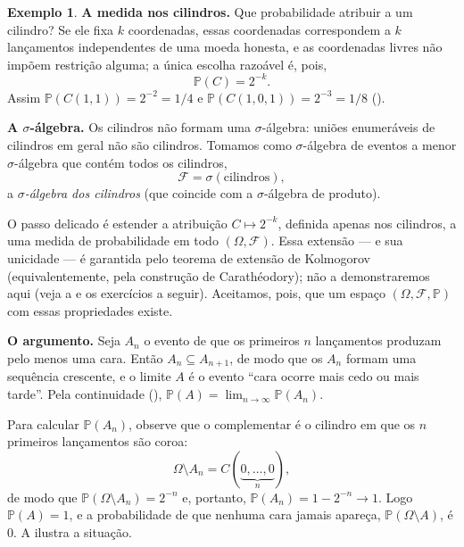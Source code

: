 \documentclass[12pt,portuguese]{article}
\theoremstyle{definition}
\newtheorem{example}[example]{Exemplo}
\begin{document}
\begin{example}
\noindent\textbf{A medida nos cilindros.} Que probabilidade atribuir a um cilindro? Se
ele fixa \(k\) coordenadas, essas coordenadas correspondem a \(k\) lançamentos
independentes de uma moeda honesta, e as coordenadas livres não impõem
restrição alguma; a única escolha razoável é, pois,
\[
\mathbb{P}(C) = 2^{-k}.
\]
Assim \(\mathbb{P}(C(1,1)) = 2^{-2} = 1/4\) e
\(\mathbb{P}(C(1,0,1)) = 2^{-3} = 1/8\) ().

\noindent\textbf{A \(\sigma\)-álgebra.} Os cilindros não formam uma \(\sigma\)-álgebra:
uniões enumeráveis de cilindros em geral não são cilindros. Tomamos como
\(\sigma\)-álgebra de eventos a menor \(\sigma\)-álgebra que contém todos os
cilindros,
\[
\mathcal{F} = \sigma(\text{cilindros}),
\]
a \emph{\(\sigma\)-álgebra dos cilindros} (que coincide com a
\(\sigma\)-álgebra de produto).

O passo delicado é estender a atribuição \(C \mapsto 2^{-k}\), definida apenas
nos cilindros, a uma medida de probabilidade em todo \((\Omega,\mathcal{F})\).
Essa extensão --- e sua unicidade --- é garantida pelo teorema de extensão de
Kolmogorov (equivalentemente, pela construção de Carathéodory); não a
demonstraremos aqui (veja a  e os exercícios a seguir).
Aceitamos, pois, que um espaço \((\Omega,\mathcal{F},\mathbb{P})\) com essas
propriedades existe.

\noindent\textbf{O argumento.} Seja \(A_n\) o evento de que os primeiros \(n\)
lançamentos produzam pelo menos uma cara. Então
\(A_n \subseteq A_{n+1}\), de modo que os \(A_n\) formam uma sequência
crescente, e o limite \(A\) é o evento ``cara ocorre mais cedo ou mais tarde''.
Pela continuidade (),
\(\mathbb{P}(A) = \lim_{n\to\infty} \mathbb{P}(A_n)\).

Para calcular \(\mathbb{P}(A_n)\), observe que o complementar é o cilindro em
que os \(n\) primeiros lançamentos são coroa:
\[
\Omega \setminus A_n = C(\underbrace{0,\ldots,0}_{n}),
\]
de modo que \(\mathbb{P}(\Omega \setminus A_n) = 2^{-n}\) e, portanto,
\(\mathbb{P}(A_n) = 1 - 2^{-n} \to 1\). Logo \(\mathbb{P}(A) = 1\), e a
probabilidade de que nenhuma cara jamais apareça,
\(\mathbb{P}(\Omega \setminus A)\), é \(0\). A  ilustra
a situação.
\end{example}
\end{document}
